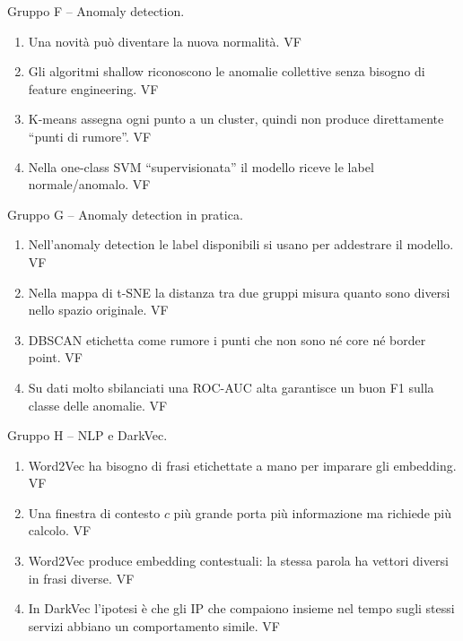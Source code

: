 \begin{domanda}\label{quiz:vfF}
Gruppo F -- Anomaly detection.
\begin{enumerate}[label=F\arabic*.,nosep,leftmargin=2.6em]
  \item Una novità può diventare la nuova normalità. \hfill V\quad F
  \item Gli algoritmi shallow riconoscono le anomalie collettive senza bisogno di feature engineering. \hfill V\quad F
  \item K-means assegna ogni punto a un cluster, quindi non produce direttamente ``punti di rumore''. \hfill V\quad F
  \item Nella one-class SVM ``supervisionata'' il modello riceve le label normale/anomalo. \hfill V\quad F
\end{enumerate}
\end{domanda}

\begin{domanda}\label{quiz:vfG}
Gruppo G -- Anomaly detection in pratica.
\begin{enumerate}[label=G\arabic*.,nosep,leftmargin=2.6em]
  \item Nell'anomaly detection le label disponibili si usano per addestrare il modello. \hfill V\quad F
  \item Nella mappa di t-SNE la distanza tra due gruppi misura quanto sono diversi nello spazio originale. \hfill V\quad F
  \item DBSCAN etichetta come rumore i punti che non sono né core né border point. \hfill V\quad F
  \item Su dati molto sbilanciati una ROC-AUC alta garantisce un buon F1 sulla classe delle anomalie. \hfill V\quad F
\end{enumerate}
\end{domanda}


\begin{domanda}\label{quiz:vfH}
Gruppo H -- NLP e DarkVec.
\begin{enumerate}[label=H\arabic*.,nosep,leftmargin=2.6em]
  \item Word2Vec ha bisogno di frasi etichettate a mano per imparare gli embedding. \hfill V\quad F
  \item Una finestra di contesto $c$ più grande porta più informazione ma richiede più calcolo. \hfill V\quad F
  \item Word2Vec produce embedding contestuali: la stessa parola ha vettori diversi in frasi diverse. \hfill V\quad F
  \item In DarkVec l'ipotesi è che gli IP che compaiono insieme nel tempo sugli stessi servizi abbiano un comportamento simile. \hfill V\quad F
\end{enumerate}
\end{domanda}

